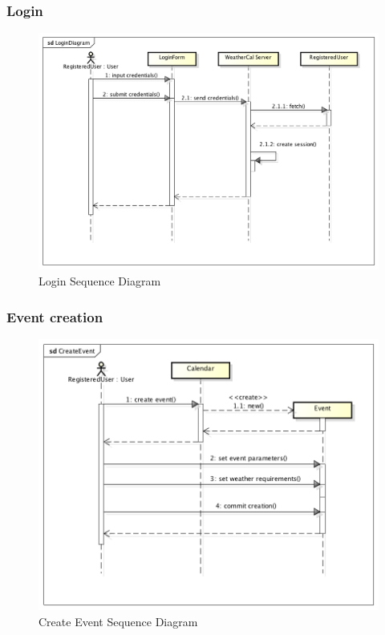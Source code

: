 \subsubsection{Login}
\begin{center}
 \begin{figure}[H]
    \includegraphics[width=1\textwidth]{../UMLDiagram/sequence/LoginDiagram/LoginDiagram.png}
    \caption{Login Sequence Diagram}
     \label{fig:logseqdiag}
     \end{figure}
   \end{center}  
\subsubsection{Event creation}
\begin{center}
 \begin{figure}[H]
    \includegraphics[width=1\textwidth]{../UMLDiagram/sequence/CreateEvent/CreateEvent.png}
    \caption{Create Event Sequence Diagram}
     \label{fig:createseqdiag}
     \end{figure}
   \end{center}  
